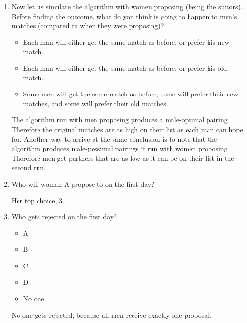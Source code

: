 \documentclass[11pt, preview]{standalone} %
\begin{document}
\begin{enumerate}
\begin{enumerate}
\item Now let us simulate the algorithm with women proposing (being the suitors). Before finding the outcome, what do you think is going to happen to men's matches (compared to when they were proposing)?
\begin{Choices}
\begin{itemize}
\FalseChoice\item Each man will either get the same match as before, or prefer his new match.
\TrueChoice\item Each man will either get the same match as before, or prefer his old match.
\FalseChoice\item Some men will get the same match as before, some will prefer their new matches, and some will prefer their old matches.
\end{itemize}
\Solution The algorithm run with men proposing produces a male-optimal pairing. Therefore the original matches are as high on their list as each man can hope for. Another way to arrive at the same conclusion is to note that the algorithm produces male-pessimal pairings if run with women proposing. Therefore men get partners that are as low as it can be on their list in the second run.
\end{Choices}

\item Who will woman A propose to on the first day?
\begin{Freeform}{3}
\Solution Her top choice, 3.	
\end{Freeform}

\item Who gets rejected on the first day?
\begin{Choices}
\begin{itemize}
\FalseChoice\item A
\FalseChoice\item B
\FalseChoice\item C
\FalseChoice\item D
\TrueChoice\item No one
\end{itemize}
\Solution No one gets rejected, because all men receive exactly one proposal.
\end{Choices}




\end{enumerate}
\end{enumerate}
\end{document}

